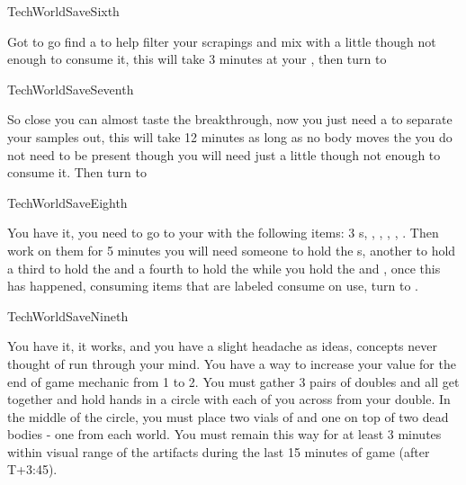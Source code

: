 \documentclass[greennotebook]{guildcamp3} %
\begin{document}
\begin{page}{TechWorldSaveSixth}
	
	 Got to go find a  \iSieve{} to help filter your scrapings and mix with a little \iBloodPlasma{} though not enough to consume it, this will take 3 minutes at your \sTechWorkbench{}, then turn to  
	
\end{page}

\begin{page}{TechWorldSaveSeventh}
	
	So close you can almost taste the breakthrough, now you just need a \iCentrifuge{} to separate your samples out, this will take 12 minutes as long as no body moves the \iCentrifuge{} you do not need to be present though you will need just a little \iGraphiteLube{} though not enough to consume it. Then turn to  
	
\end{page}

\begin{page}{TechWorldSaveEighth}
	
	 You have it, you need to go to your \sTechWorkbench{} with the following items: 3 \iTFResistor{}s, \iScrapMetal{}, \iCog{}, \iCircuitBoard{}, \iFlashlight{}, \iMultitool{}. Then work on them for 5 minutes you will need someone to hold the \iTFResistor{}s, another to hold  \iScrapMetal{} a third to hold the \iCog{} and a fourth to hold the \iCircuitBoard{} while you hold the \iFlashlight{} and \iMultitool{}, once this has happened, consuming items that are labeled consume on use, turn to .
	
\end{page}

\begin{page}{TechWorldSaveNineth}
	
	You have it, it works, and you have a slight headache as ideas, concepts never thought of run through your mind. You have a way to increase your value for the end of game mechanic from 1 to 2.  You must gather 3 pairs of doubles and all get together and hold hands in a circle with each of you across from your double. In the middle of the circle, you must place two vials of \iBloodPlasma{} and one \iEctoplasm{} on top of two dead bodies - one from each world. You must remain this way for at least 3 minutes within visual range of the artifacts during the last 15 minutes of game (after T+3:45). 
	
\end{page}

\endnotebook
\end{document}
